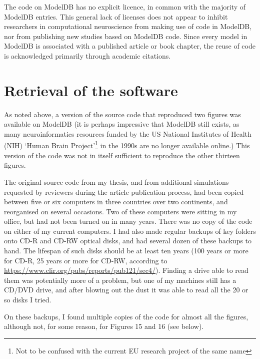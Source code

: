 The code on ModelDB has no explicit licence, in common with the majority of ModelDB entries.
This general lack of licenses does not appear to inhibit researchers in computational neuroscience from
making use of code in ModelDB, nor from publishing new studies based on ModelDB code.
Since every model in ModelDB is associated with a published article or book chapter,
the reuse of code is acknowledged primarily through academic citations.



\section{Retrieval of the software}


As noted above, a version of the source code that reproduced two figures was available on ModelDB
(it is perhaps impressive that ModelDB still exists, as many neuroinformatics resources funded by the
US National Institutes of Health (NIH) `Human Brain Project'\footnote{Not to be confused with the current EU research project of the same name}
in the 1990s are no longer available online.)
This version of the code was not in itself sufficient to reproduce the other thirteen figures.

The original source code from my thesis, and from additional simulations requested by reviewers during the article publication process,
had been copied between five or six computers in three countries over two continents,
and reorganised on several occasions. Two of these computers were sitting in my office, but had not been turned on in many years.
There was no copy of the code on either of my current computers.
I had also made regular backups of key folders onto CD-R and CD-RW optical disks, and had several dozen of these backups to hand.
The lifespan of such disks should be at least ten years (100 years or more for CD-R, 25 years or more for CD-RW, according to \url{https://www.clir.org/pubs/reports/pub121/sec4/}). Finding a drive able to read them was potentially more of a problem, but one of my machines
still has a CD/DVD drive, and after blowing out the dust it was able to read all the 20 or so disks I tried.

On these backups, I found multiple copies of the code for almost all the figures, although not, for some reason, for Figures 15 and 16 (see below).

